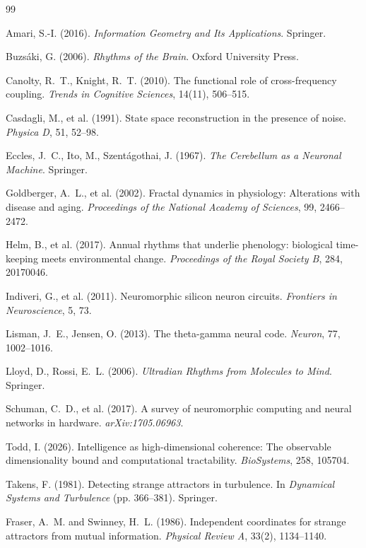 \documentclass[12pt]{article}
\begin{document}

\begin{thebibliography}{99}

Amari, S.-I. (2016). \emph{Information Geometry and Its Applications}. Springer.

Buzs\'aki, G. (2006). \emph{Rhythms of the Brain}. Oxford University Press.

Canolty, R.~T., Knight, R.~T. (2010). The functional role of cross-frequency coupling. \emph{Trends in Cognitive Sciences}, 14(11), 506--515.

Casdagli, M., et al. (1991). State space reconstruction in the presence of noise. \emph{Physica D}, 51, 52--98.

Eccles, J.~C., Ito, M., Szentágothai, J. (1967). \emph{The Cerebellum as a Neuronal Machine}. Springer.

Goldberger, A.~L., et al. (2002). Fractal dynamics in physiology: Alterations with disease and aging. \emph{Proceedings of the National Academy of Sciences}, 99, 2466--2472.

Helm, B., et al. (2017). Annual rhythms that underlie phenology: biological time-keeping meets environmental change. \emph{Proceedings of the Royal Society B}, 284, 20170046.

Indiveri, G., et al. (2011). Neuromorphic silicon neuron circuits. \emph{Frontiers in Neuroscience}, 5, 73.

Lisman, J.~E., Jensen, O. (2013). The theta-gamma neural code. \emph{Neuron}, 77, 1002--1016.

Lloyd, D., Rossi, E.~L. (2006). \emph{Ultradian Rhythms from Molecules to Mind}. Springer.

Schuman, C.~D., et al. (2017). A survey of neuromorphic computing and neural networks in hardware. \emph{arXiv:1705.06963}.

Todd, I. (2026). Intelligence as high-dimensional coherence: The observable dimensionality bound and computational tractability. \emph{BioSystems}, 258, 105704.

Takens, F. (1981). Detecting strange attractors in turbulence. In \emph{Dynamical Systems and Turbulence} (pp. 366--381). Springer.

Fraser, A.~M. and Swinney, H.~L. (1986). Independent coordinates for strange attractors from mutual information. \emph{Physical Review A}, 33(2), 1134--1140.

\end{thebibliography}
\end{document}
